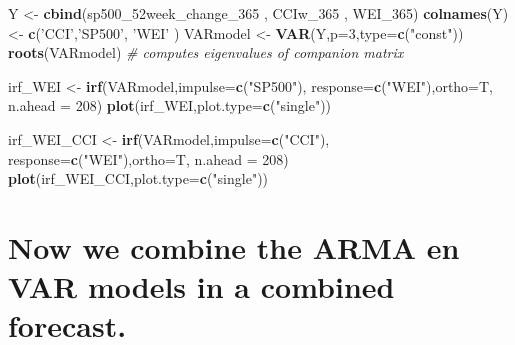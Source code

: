 \documentclass[]{article}
\newenvironment{Shaded}{\begin{snugshade}}{\end{snugshade}}
\newcommand{\KeywordTok}[1]{\textcolor[rgb]{0.13,0.29,0.53}{\textbf{#1}}}
\newcommand{\DataTypeTok}[1]{\textcolor[rgb]{0.13,0.29,0.53}{#1}}
\newcommand{\DecValTok}[1]{\textcolor[rgb]{0.00,0.00,0.81}{#1}}
\newcommand{\StringTok}[1]{\textcolor[rgb]{0.31,0.60,0.02}{#1}}
\newcommand{\CommentTok}[1]{\textcolor[rgb]{0.56,0.35,0.01}{\textit{#1}}}
\newcommand{\NormalTok}[1]{#1}
\begin{document}
\begin{Shaded}
\begin{Highlighting}[]
\NormalTok{Y           <-}\StringTok{ }\KeywordTok{cbind}\NormalTok{(sp500_52week_change_}\DecValTok{365}\NormalTok{ , CCIw_}\DecValTok{365}\NormalTok{  ,  WEI_}\DecValTok{365}\NormalTok{)}
\KeywordTok{colnames}\NormalTok{(Y) <-}\StringTok{ }\KeywordTok{c}\NormalTok{(}\StringTok{'CCI'}\NormalTok{,}\StringTok{'SP500'}\NormalTok{, }\StringTok{'WEI'}\NormalTok{ )}
\NormalTok{VARmodel    <-}\StringTok{ }\KeywordTok{VAR}\NormalTok{(Y,}\DataTypeTok{p=}\DecValTok{3}\NormalTok{,}\DataTypeTok{type=}\KeywordTok{c}\NormalTok{(}\StringTok{"const"}\NormalTok{))}
\KeywordTok{roots}\NormalTok{(VARmodel) }\CommentTok{# computes eigenvalues of companion matrix}


\NormalTok{irf_WEI <-}\StringTok{ }\KeywordTok{irf}\NormalTok{(VARmodel,}\DataTypeTok{impulse=}\KeywordTok{c}\NormalTok{(}\StringTok{"SP500"}\NormalTok{),}
               \DataTypeTok{response=}\KeywordTok{c}\NormalTok{(}\StringTok{"WEI"}\NormalTok{),}\DataTypeTok{ortho=}\NormalTok{T, }\DataTypeTok{n.ahead =} \DecValTok{208}\NormalTok{)}
\KeywordTok{plot}\NormalTok{(irf_WEI,}\DataTypeTok{plot.type=}\KeywordTok{c}\NormalTok{(}\StringTok{"single"}\NormalTok{))}

\NormalTok{irf_WEI_CCI <-}\StringTok{ }\KeywordTok{irf}\NormalTok{(VARmodel,}\DataTypeTok{impulse=}\KeywordTok{c}\NormalTok{(}\StringTok{"CCI"}\NormalTok{),}
                   \DataTypeTok{response=}\KeywordTok{c}\NormalTok{(}\StringTok{"WEI"}\NormalTok{),}\DataTypeTok{ortho=}\NormalTok{T, }\DataTypeTok{n.ahead =} \DecValTok{208}\NormalTok{)}
\KeywordTok{plot}\NormalTok{(irf_WEI_CCI,}\DataTypeTok{plot.type=}\KeywordTok{c}\NormalTok{(}\StringTok{"single"}\NormalTok{))}
\end{Highlighting}
\end{Shaded}

\section{Now we combine the ARMA en VAR models in a combined
forecast.}\label{now-we-combine-the-arma-en-var-models-in-a-combined-forecast.}
\end{document}
